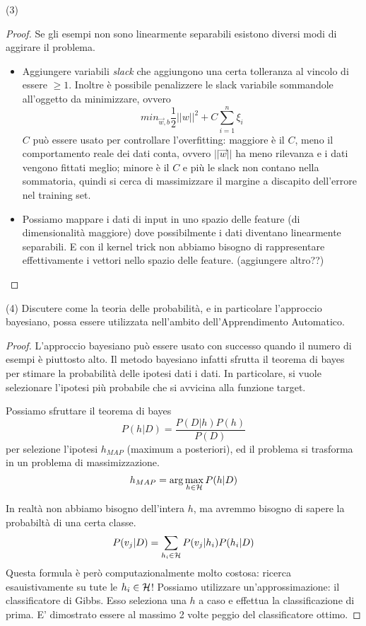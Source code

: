 \documentclass[12pt,a4paper,oneside]{book}
\begin{document}
\begin{exercise}{(3)}
\begin{proof}
   		Se gli esempi non sono linearmente separabili esistono diversi modi di aggirare il problema.
   		\begin{itemize}
   			\item Aggiungere variabili \emph{slack} che aggiungono una certa tolleranza al vincolo di essere $\geq 1$. Inoltre è possibile penalizzere le slack variabile sommandole all'oggetto da minimizzare, ovvero
   			\[
   				min_{\vec{w},b} \frac{1}{2} ||w||^2 + C \sum_{i=1}^{n} \xi_i
   			\]
   			$C$ può essere usato per controllare l'overfitting: maggiore è il $C$, meno il comportamento reale dei dati conta, ovvero $||\vec{w}||$ ha meno rilevanza e i dati vengono fittati meglio; minore è il $C$ e più le slack non contano nella sommatoria, quindi si cerca di massimizzare il margine a discapito dell'errore nel training set.
   			
   			\item Possiamo mappare i dati di input in uno spazio delle feature (di dimensionalità maggiore) dove possibilmente i dati diventano linearmente separabili.
   			E con il kernel trick non abbiamo bisogno di rappresentare effettivamente i vettori nello spazio delle feature.
   			(aggiungere altro??)
   		\end{itemize}
    \end{proof}
\end{exercise}

\begin{exercise}{(4)}
    Discutere come la teoria delle probabilità, e in particolare
    l'approccio bayesiano, possa essere utilizzata nell'ambito
    dell'Apprendimento Automatico.
\end{exercise}

\begin{proof}
	L'approccio bayesiano può essere usato con successo quando il numero di esempi è piuttosto alto. Il metodo bayesiano infatti sfrutta il teorema di bayes per stimare la probabilità delle ipotesi dati i dati. In particolare, si vuole selezionare l'ipotesi più probabile che si avvicina alla funzione target.
	
	Possiamo sfruttare il teorema di bayes 
	\[
		P(h|D) = \frac{P(D|h)P(h)}{P(D)}
	\]
	per selezione l'ipotesi $h_{MAP}$ (maximum a posteriori), ed il problema si trasforma in un problema di massimizzazione.
	\[
		h_{MAP} = \arg \max_{h \in \mathcal{H}} P(h|D)
	\]
	
	In realtà non abbiamo bisogno dell'intera $h$, ma avremmo bisogno di sapere la probabiltà di una certa classe.
	\[
		P(v_j|D) = \sum_{h_i \in \mathcal{H}} P(v_j|h_i) P(h_i|D)
	\]
	Questa formula è però computazionalmente molto costosa: ricerca esauistivamente su tute le $h_i \in \mathcal{H}$! Possiamo utilizzare un'approssimazione: il classificatore di Gibbs. Esso seleziona una $h$ a caso e effettua la classificazione di prima. E' dimostrato essere al massimo 2 volte peggio del classificatore ottimo.
\end{proof}
\end{document}
